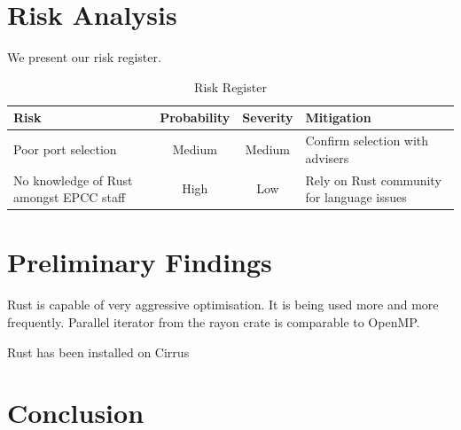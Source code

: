 \documentclass{article}[a4]
\begin{document}
\section{Risk Analysis}
We present our risk register.
\begin{table}[h]
  \centering
  \begin{tabular}{p{4cm} c c p{4cm}}
    Risk & Probability & Severity & Mitigation \\
    \hline
    Poor port selection & Medium & Medium & Confirm selection with advisers \\ \hline

    No knowledge of Rust amongst EPCC staff & High & Low & Rely on Rust community for language issues \\
    \end{tabular}
  \caption{Risk Register}
  \label{tab:risk}
\end{table}
\section{Preliminary Findings}
Rust is capable of very aggressive optimisation. It is being used more and more frequently. Parallel iterator from the rayon crate is comparable to OpenMP.

Rust has been installed on Cirrus
\section{Conclusion}
\pagebreak


\end{document}
